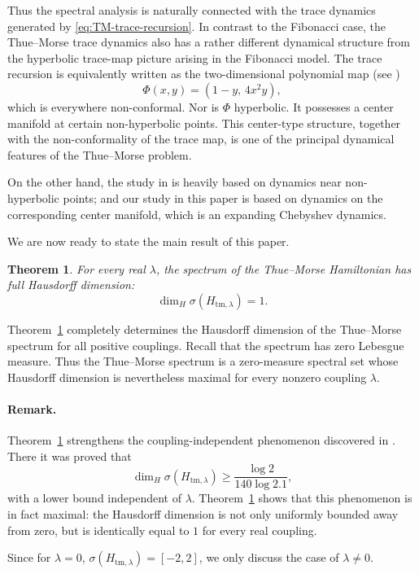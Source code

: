 \documentclass{amsart}
\newtheorem{thm}{Theorem}
\theoremstyle{definition}
\begin{document}
Thus the spectral analysis is naturally connected with the trace dynamics generated by \eqref{eq:TM-trace-recursion}. 
In contrast to the Fibonacci case,
the Thue--Morse trace dynamics also has a rather different dynamical
structure from the hyperbolic trace-map picture arising in the
Fibonacci model. 
The trace recursion is equivalently written as the two-dimensional polynomial map (see \cite{AP89,B89})
\[
    \Phi(x,y)
    =
    (1-y,\,4x^2y),
\]
which is everywhere non-conformal. 
Nor is $\Phi$ hyperbolic. It possesses a center manifold at certain non-hyperbolic points.
This center-type structure, together with the non-conformality of the
trace map, is one of the principal dynamical features of the
Thue--Morse problem.

On the other hand, the study in \cite{LQ15,LQY17} is  heavily
based on dynamics near non-hyperbolic points;
and our study in this paper is based on dynamics on the corresponding center manifold,
which is an expanding Chebyshev dynamics.

We are now ready to state the main result of this paper.

\begin{thm}\label{thm:main}
For every real \(\lambda\), the spectrum of the Thue--Morse Hamiltonian
has full Hausdorff dimension:
\[
    \dim_H \sigma(H_{\mathrm{tm},\lambda})=1.
\]
\end{thm}

Theorem~\ref{thm:main} completely determines the Hausdorff dimension of
the Thue--Morse spectrum for all positive couplings. Recall that the
spectrum has zero Lebesgue measure. Thus the Thue--Morse spectrum is a
zero-measure spectral set whose Hausdorff dimension is nevertheless
maximal for every nonzero coupling \(\lambda\).

\paragraph{\textbf{Remark.}}
Theorem~\ref{thm:main} strengthens the coupling-independent phenomenon
discovered in \cite{LQ15}. There it was proved that
\[
    \dim_H \sigma(H_{\mathrm{tm},\lambda})
    \geq
    \frac{\log 2}{140\log 2.1},
\]
with a lower bound independent of \(\lambda\).
Theorem~\ref{thm:main} shows that this phenomenon is in fact maximal:
the Hausdorff dimension is not only uniformly bounded away from zero,
but is identically equal to \(1\) for every real coupling.


Since for $\lambda=0$, $\sigma(H_{\mathrm{tm},\lambda})=[-2,2]$, we only discuss the case of $\lambda\ne0$.
\end{document}
